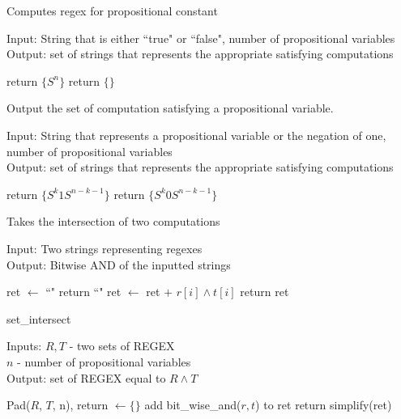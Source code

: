 \documentclass[runningheads]{llncs}
\begin{document}
\begin{algorithm}[H]
\caption{Computes regex for propositional constant}
Input: String that is either ``true" or ``false", number of propositional variables\\
Output: set of strings that represents the appropriate satisfying computations
\begin{algorithmic}
     return $\{S^n\}$
    \Else \hspace{1mm} return $\{\}$ 
    \EndIf
\EndProcedure
\end{algorithmic}
\end{algorithm}

\begin{algorithm}[H]
\caption{Output the set of computation satisfying a propositional variable.}
Input: String that represents a propositional variable or the negation of one, number of propositional variables \\
Output: set of strings that represents the appropriate satisfying computations
\begin{algorithmic}
     return $\{S^k1S^{n-k-1}\}$
    \EndIf 
     return $\{S^k0S^{n-k-1}\}$
    \EndIf
\EndProcedure
\end{algorithmic}
\end{algorithm}

\begin{algorithm}[H]
\caption{Takes the intersection of two computations}
Input: Two strings representing regexes\\
Output: Bitwise AND of the inputted strings
\begin{algorithmic}
    \State ret $\leftarrow$ ``" 
         return ``"
        \Else \hspace{1mm} ret $\leftarrow$ ret $+$ $r[i] \land t[i]$
        \EndIf
    \EndFor
    \State return ret
\EndProcedure
\end{algorithmic}
\end{algorithm}

\begin{algorithm}[H]
\caption{set\_intersect}
Inputs: $R, T$ - two sets of REGEX\\
$n$ - number of propositional variables\\
Output: set of REGEX equal to $R \land T$
\begin{algorithmic}
    \State Pad($R$, $T$, n), return $\leftarrow \{\}$
            \State add bit\_wise\_and($r, t$) to ret 
    \EndFor
    \State return simplify(ret)
\EndProcedure
\end{algorithmic}
\end{algorithm}
\end{document}
